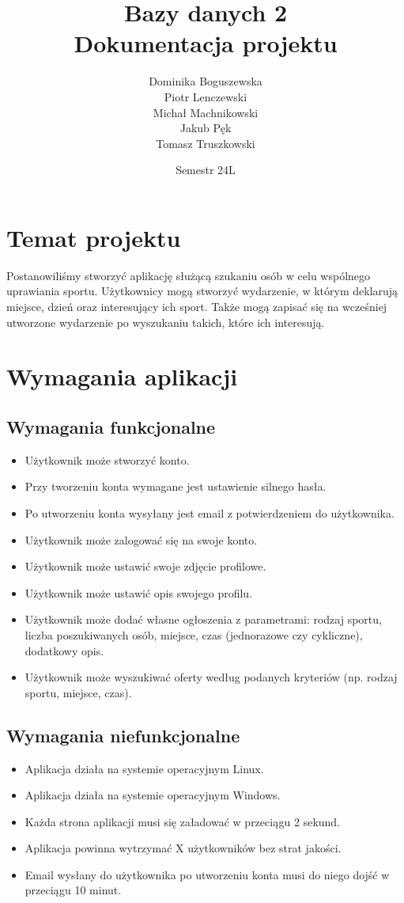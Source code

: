 \documentclass[11pt,a4paper]{article}
\title{Bazy danych 2 \\
Dokumentacja projektu}
\author{Dominika Boguszewska \\
Piotr Lenczewski \\
Michał Machnikowski \\
Jakub Pęk \\
Tomasz Truszkowski}
\date{Semestr 24L}
\begin{document}
\maketitle

\section{Temat projektu}

Postanowiliśmy stworzyć aplikację służącą szukaniu osób w celu wspólnego uprawiania sportu. Użytkownicy mogą stworzyć wydarzenie, w którym deklarują miejsce, dzień oraz interesujący ich sport. Także mogą zapisać się na wcześniej utworzone wydarzenie po wyszukaniu takich, które ich interesują.

\section{Wymagania aplikacji}

\subsection{Wymagania funkcjonalne}

\begin{itemize}
    \item Użytkownik może stworzyć konto.
    \item Przy tworzeniu konta wymagane jest ustawienie silnego hasła.
    \item Po utworzeniu konta wysyłany jest email z potwierdzeniem do użytkownika.
    \item Użytkownik może zalogować się na swoje konto.
    \item Użytkownik może ustawić swoje zdjęcie profilowe.
    \item Użytkownik może ustawić opis swojego profilu.
    \item Użytkownik może dodać własne ogłoszenia z parametrami: rodzaj sportu, liczba poszukiwanych osób, miejsce, czas (jednorazowe czy cykliczne), dodatkowy opis.
    \item Użytkownik może wyszukiwać oferty według podanych kryteriów (np. rodzaj sportu, miejsce, czas).
\end{itemize}
 
\subsection{Wymagania niefunkcjonalne}

\begin{itemize}
    \item Aplikacja działa na systemie operacyjnym Linux.
    \item Aplikacja działa na systemie operacyjnym Windows.
    \item Każda strona aplikacji musi się załadować w przeciągu 2 sekund.
    \item Aplikacja powinna wytrzymać X użytkowników bez strat jakości.
    \item Email wysłany do użytkownika po utworzeniu konta musi do niego dojść w przeciągu 10 minut.
\end{itemize}
\end{document}
